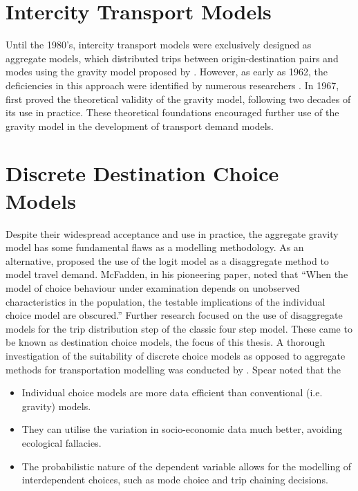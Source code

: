 \section{Intercity Transport Models}
Until the 1980’s, intercity transport models were exclusively designed as aggregate models, which distributed trips between origin-destination pairs and modes using the gravity model proposed by \autocite{casey55}. However, as early as 1962, the deficiencies in this approach were identified by numerous researchers \autocite*{OiSchu62, Warner62}. In 1967, \autocite{Wilson67} first proved the theoretical validity of the gravity model, following two decades of its use in practice. These theoretical foundations encouraged further use of the gravity model in the development of transport demand models. 

\section{Discrete Destination Choice Models}
Despite their widespread acceptance and use in practice, the aggregate gravity model has some fundamental flaws as a modelling methodology. As an alternative, \textcite*{McFadden73, Akiva74} proposed the use of the logit model as a disaggregate method to model travel demand. McFadden, in his pioneering paper, noted that \enquote{When the model of choice behaviour under examination depends on unobserved characteristics in the population, the testable implications of the individual choice model are obscured.}\parencite{McFadden73}
Further research focused on the use of disaggregate models for the trip distribution step of the classic four step model. These came to be known as destination choice models, the focus of this thesis. A thorough investigation of the suitability of discrete choice models as opposed to aggregate methods for transportation modelling was conducted by \textcite{Spear77}. Spear noted that the 
\begin{itemize}
\item Individual choice models are more data efficient than conventional (i.e. gravity) models.
\item They can utilise the variation in socio-economic data much better, avoiding ecological fallacies.
\item The probabilistic nature of the dependent variable allows for the modelling of interdependent choices, such as mode choice and trip chaining decisions. 
\end{itemize}
	
